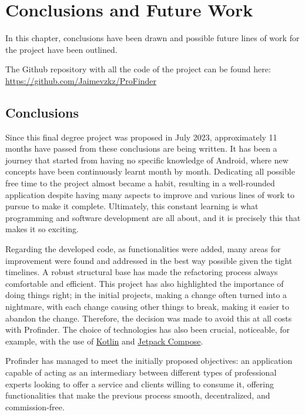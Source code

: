 \chapter*{Conclusions and Future Work}
\label{cap:conclusions}
In this chapter, conclusions have been drawn and possible future lines of work for the project have been outlined.

The Github repository with all the code of the project can be found here: \url{https://github.com/Jaimevzkz/ProFinder}

\section*{Conclusions}
Since this final degree project was proposed in July 2023, approximately 11 months have passed from these conclusions are being written. It has been a journey that started from having no specific knowledge of Android, where new concepts have been continuously learnt month by month. Dedicating all possible free time to the project almost became a habit, resulting in a well-rounded application despite having many aspects to improve and various lines of work to pursue to make it complete. Ultimately, this constant learning is what programming and software development are all about, and it is precisely this that makes it so exciting.

Regarding the developed code, as functionalities were added, many areas for improvement were found and addressed in the best way possible given the tight timelines. A robust structural base has made the refactoring process always comfortable and efficient. This project has also highlighted the importance of doing things right; in the initial projects, making a change often turned into a nightmare, with each change causing other things to break, making it easier to abandon the change. Therefore, the decision was made to avoid this at all costs with Profinder. The choice of technologies has also been crucial, noticeable, for example, with the use of \hyperlink{subsec:kotlin}{Kotlin} and \hyperlink{subsec:compose}{Jetpack Compose}.

Profinder has managed to meet the initially proposed objectives: an application capable of acting as an intermediary between different types of professional experts looking to offer a service and clients willing to consume it, offering functionalities that make the previous process smooth, decentralized, and commission-free.

